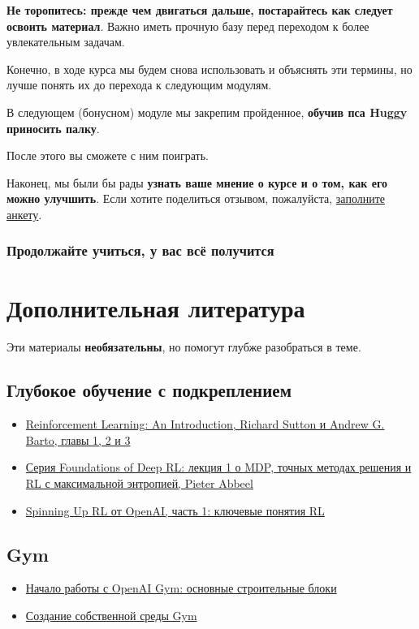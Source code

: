 \documentclass[11pt,a4paper]{article}
\begin{document}
\textbf{Не торопитесь: прежде чем двигаться дальше, постарайтесь как следует освоить материал}. Важно иметь прочную базу перед переходом к более увлекательным задачам.

Конечно, в ходе курса мы будем снова использовать и объяснять эти термины, но лучше понять их до перехода к следующим модулям.

В следующем (бонусном) модуле мы закрепим пройденное, \textbf{обучив пса Huggy приносить палку}.

После этого вы сможете с ним поиграть.


Наконец, мы были бы рады \textbf{узнать ваше мнение о курсе и о том, как его можно улучшить}. Если хотите поделиться отзывом, пожалуйста, \href{https://forms.gle/BzKXWzLAGZESGNaE9}{заполните анкету}.

\subsubsection{Продолжайте учиться, у вас всё получится}\label{keep-learning-stay-awesome-1}

\section{Дополнительная литература}\label{additional-readings}

Эти материалы \textbf{необязательны}, но помогут глубже разобраться в теме.

\subsection{Глубокое обучение с подкреплением}\label{deep-reinforcement-learning}

\begin{itemize}
\tightlist
\item
  \href{http://incompleteideas.net/book/RLbook2020.pdf}{Reinforcement Learning: An Introduction, Richard Sutton и Andrew G. Barto, главы 1, 2 и 3}
\item
  \href{https://youtu.be/2GwBez0D20A}{Серия Foundations of Deep RL: лекция 1 о MDP, точных методах решения и RL с максимальной энтропией, Pieter Abbeel}
\item
  \href{https://spinningup.openai.com/en/latest/spinningup/rl_intro.html}{Spinning Up RL от OpenAI, часть 1: ключевые понятия RL}
\end{itemize}

\subsection{Gym}\label{gym}

\begin{itemize}
\tightlist
\item
  \href{https://blog.paperspace.com/getting-started-with-openai-gym/}{Начало работы с OpenAI Gym: основные строительные блоки}
\item
  \href{https://www.gymlibrary.dev/content/environment_creation/}{Создание собственной среды Gym}
\end{itemize}
\end{document}

